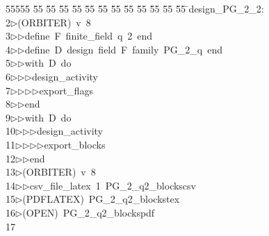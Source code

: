 %
%
\begin{tabbing}
55555 \= 55 \= 55 \= 55 \= 55 \= 55 \= 55 \= 55 \= 55 \= 55 \= 55 \= 55 \= 55 \= \>design\_PG\_2\_2:\\[0pt]
2\>$\triangleright$\>(ORBITER)\ v\ 8\ \\[0pt]
3\>$\triangleright$\>$\triangleright$\>define\ F\ finite\_field\ q\ 2\ end\ \\[0pt]
4\>$\triangleright$\>$\triangleright$\>define\ D\ design\ field\ F\ family\ PG\_2\_q\ end\ \\[0pt]
5\>$\triangleright$\>$\triangleright$\>with\ D\ do\ \\[0pt]
6\>$\triangleright$\>$\triangleright$\>$\triangleright$\>design\_activity\ \\[0pt]
7\>$\triangleright$\>$\triangleright$\>$\triangleright$\>$\triangleright$\>export\_flags\ \\[0pt]
8\>$\triangleright$\>$\triangleright$\>end\ \\[0pt]
9\>$\triangleright$\>$\triangleright$\>with\ D\ do\ \\[0pt]
10\>$\triangleright$\>$\triangleright$\>$\triangleright$\>design\_activity\ \\[0pt]
11\>$\triangleright$\>$\triangleright$\>$\triangleright$\>$\triangleright$\>export\_blocks\ \\[0pt]
12\>$\triangleright$\>$\triangleright$\>end\\[0pt]
13\>$\triangleright$\>(ORBITER)\ v\ 8\ \\[0pt]
14\>$\triangleright$\>$\triangleright$\>csv\_file\_latex\ 1\ PG\_2\_q2\_blockscsv\ \\[0pt]
15\>$\triangleright$\>(PDFLATEX)\ PG\_2\_q2\_blockstex\\[0pt]
16\>$\triangleright$\>(OPEN)\ PG\_2\_q2\_blockspdf\\[0pt]
17\>\end{tabbing}
